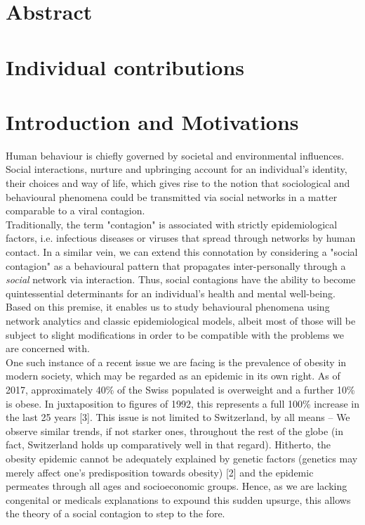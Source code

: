 \documentclass[11pt]{article}
\begin{document}
\section{Abstract}

\section{Individual contributions}

\section{Introduction and Motivations}
Human behaviour is chiefly governed by societal and environmental influences. Social interactions, nurture and upbringing account for an individual’s identity, their choices and way of life, which gives rise to the notion that sociological and behavioural phenomena could be transmitted via social networks in a matter comparable to a viral contagion.\\

Traditionally, the term "contagion" is associated with strictly epidemiological factors, i.e. infectious diseases or viruses that spread through networks by human contact. In a similar vein, we can extend this connotation by considering a "social contagion" as a behavioural pattern that propagates inter-personally through a \textit{social} network via interaction. Thus, social contagions have the ability to become quintessential determinants for an individual’s health and mental well-being. Based on this premise, it enables us to study behavioural phenomena using network analytics and classic epidemiological models, albeit most of those will be subject to slight modifications in order to be compatible with the problems we are concerned with.\\

One such instance of a recent issue we are facing is the prevalence of obesity in modern society, which may be regarded as an epidemic in its own right. As of 2017, approximately 40\% of the Swiss populated is overweight and a further 10\% is obese. In juxtaposition to figures of 1992, this represents a full 100\% increase in the last 25 years [3]. This issue is not limited to Switzerland, by all means – We observe similar trends, if not starker ones, throughout the rest of the globe (in fact, Switzerland holds up comparatively well in that regard). Hitherto, the obesity epidemic cannot be adequately explained by genetic factors (genetics may merely affect one’s predisposition towards obesity) [2] and the epidemic permeates through all ages and socioeconomic groups. Hence, as we are lacking congenital or medicals explanations to expound this sudden upsurge, this allows the theory of a social contagion to step to the fore.\\
\end{document}
